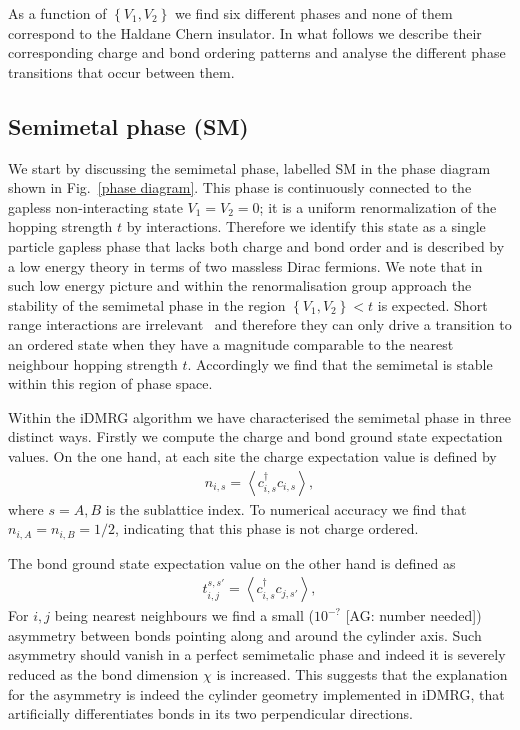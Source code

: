 \documentclass[aps,prx,10pt,twocolumn,floatfix,superscriptaddress,showpacs,numerical,footinbib]{revtex4-1}
\newcommand{\noteAG}[1]{{\color{blue} [AG: #1]}}
\begin{document}
%
As a function of $\left\lbrace V_{1},V_{2}\right\rbrace$ we find six different phases and none of them correspond to the Haldane Chern insulator.
%
In what follows we describe their corresponding charge and bond ordering patterns and analyse the different phase transitions that occur between them.
%


%
\subsection{Semimetal phase (SM)}
%
We start by discussing the semimetal phase, labelled SM in the phase diagram shown in Fig.~\ref{phase diagram}.
%
This phase is continuously connected to the gapless non-interacting state $V_{1}=V_{2}=0$; 
it is a uniform renormalization of the hopping strength $t$ by interactions.
%
Therefore we identify this state as a single particle gapless phase that lacks both charge and bond order and is described by a low energy theory in terms of two massless Dirac fermions.
%
We note that in such low energy picture and within the renormalisation group approach the stability of the semimetal phase in the region $\left\lbrace V_{1},V_{2}\right\rbrace < t$ is expected.
%
Short range interactions are irrelevant~\cite{Shankar?} and therefore they can only drive a transition to an ordered state when they have a magnitude comparable to the nearest neighbour hopping strength $t$.
%
Accordingly we find that the semimetal is stable within this region of phase space.


Within the iDMRG algorithm we have characterised the semimetal phase in three distinct ways.
%
Firstly we compute the charge and bond ground state expectation values.
%
On the one hand, at each site the charge expectation value is defined by 
%
\begin{eqnarray}
\label{eq:charge}
n_{i,s}=\left\langle c^{\dagger}_{i,s}c_{i,s}\right\rangle,  
\end{eqnarray}
%
where $s=A,B$ is the sublattice index.
%
To numerical accuracy we find that $n_{i,A}=n_{i,B}=1/2$, indicating that this phase is not charge ordered.
%

The bond ground state expectation value on the other hand is defined as
%
\begin{eqnarray}
\label{eq:bond}
t^{s,s'}_{i,j}=\left\langle c^{\dagger}_{i,s}c_{j,s'}\right\rangle,  
\end{eqnarray}
%
For $i,j$ being nearest neighbours we find a small ($10^{-?}$ \noteAG{number needed}) asymmetry
between bonds pointing along and around the cylinder axis.
%
Such asymmetry should vanish in a perfect semimetalic phase and indeed it is severely reduced as the bond dimension $\chi$ is increased.
% 
This suggests that the explanation for the asymmetry is indeed the cylinder geometry implemented in iDMRG, that artificially differentiates bonds in its two perpendicular directions.
%
\end{document}
